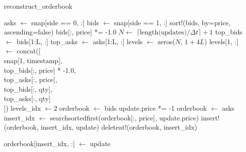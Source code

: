 \begin{algorithm*}
\caption{reconstruct\_orderbook}
\begin{algorithmic}[1]
    \State asks $\gets$ snap[side == 0, :]
    \State bids $\gets$ snap[side == 1, :]
    \State sort!(bids, by=price, ascending=false) 
    \State bids[:, price] *= -1.0 
    \State $N \gets$ $\lceil \text{length(updates)} / \Delta t \rceil+ 1$ 
    \State top\_bids $\gets$ bids[1:L, :] 
    \State top\_asks $\gets$ asks[1:L, :]
    \State levels $\gets$ zeros($N$, $1 + 4L$)  
    \State levels[1, :] $\gets$ concat([  \\
    \hspace{35pt}  snap[1, timestamp], \\
    \hspace{35pt}  top\_bids[:, price] * -1.0, \\
    \hspace{35pt}  top\_asks[:, price],\\
    \hspace{35pt}  top\_bids[:, qty],\\
    \hspace{35pt}  top\_asks[:, qty]\\
    \hspace{16pt}])
    \State levels\_idx $\gets 2$
     
            \State orderbook $\gets$ bids  
            \State update.price *= -1  
        \Else
            \State orderbook $\gets$ asks
        \EndIf
        \State insert\_idx $\gets$ searchsortedfirst(orderbook[:, price], update.price)
            \State insert!(orderbook, insert\_idx, update) 
             
            \State deleteat!(orderbook, insert\_idx)

            \Else  {}             
            \State orderbook[insert\_idx, :] $\gets$ update
        \EndIf \\


\end{algorithmic}
\end{algorithm*}
